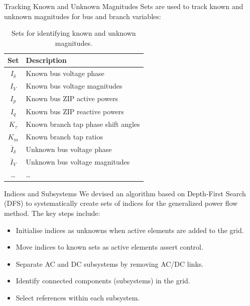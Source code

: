 \begin{frame}{Tracking Known and Unknown Magnitudes}
    Sets are used to track known and unknown magnitudes for bus and branch variables:
    
    \begin{table}[!htb]
    \centering
    \caption{Sets for identifying known and unknown magnitudes.}
    \begin{tabular}{cl}
        \hline
        \textbf{Set} & \textbf{Description} \\
        \hline
        $I_{\delta}$ & Known bus voltage phase \\
        $I_{V}$ & Known bus voltage magnitudes \\
        $I_{p}$ & Known bus ZIP active powers \\
        $I_{q}$ & Known bus ZIP reactive powers \\
        $K_{\tau}$ & Known branch tap phase shift angles \\
        $K_{m}$ & Known branch tap ratios \\
        $\overline{I}_{\delta}$ & Unknown bus voltage phase \\
        $\overline{I}_{V}$ & Unknown bus voltage magnitudes \\
        \dots & \dots \\
        \hline
    \end{tabular}
    \label{tab:setsver2}
    \end{table}
\end{frame}

\begin{frame}{Indices and Subsystems}
    We devised an algorithm based on Depth-First Search (DFS) to systematically create sets of indices for the generalized power flow method. The key steps include:
    \begin{itemize}
        \item Initialise indices as unknowns when active elements are added to the grid.
        \item Move indices to known sets as active elements assert control.
        \item Separate AC and DC subsystems by removing AC/DC links.
        \item Identify connected components (subsystems) in the grid.
        \item Select references within each subsystem.
    \end{itemize}
\end{frame}



